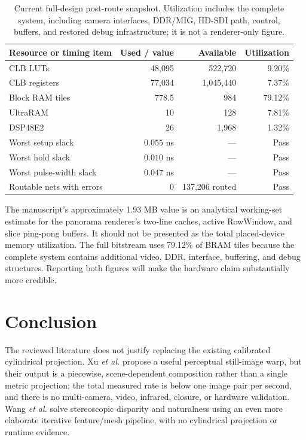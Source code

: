 \documentclass[10pt]{article}
\begin{document}
\begin{table}[ht]
\centering
\caption{Current full-design post-route snapshot. Utilization includes the complete system, including camera interfaces, DDR/MIG, HD-SDI path, control, buffers, and restored debug infrastructure; it is not a renderer-only figure.}
\label{tab:fpga}
\small
\begin{tabular}{@{}lrrr@{}}
\toprule
Resource or timing item & Used / value & Available & Utilization \\
\midrule
CLB LUTs & 48,095 & 522,720 & 9.20\% \\
CLB registers & 77,034 & 1,045,440 & 7.37\% \\
Block RAM tiles & 778.5 & 984 & 79.12\% \\
UltraRAM & 10 & 128 & 7.81\% \\
DSP48E2 & 26 & 1,968 & 1.32\% \\
\midrule
Worst setup slack & $0.055$ ns & --- & Pass \\
Worst hold slack & $0.010$ ns & --- & Pass \\
Worst pulse-width slack & $0.047$ ns & --- & Pass \\
Routable nets with errors & 0 & 137,206 routed & Pass \\
\bottomrule
\end{tabular}
\end{table}

The manuscript's approximately 1.93 MB value is an analytical working-set estimate for the panorama renderer's two-line caches, active RowWindow, and slice ping-pong buffers. It should not be presented as the total placed-device memory utilization. The full bitstream uses 79.12\% of BRAM tiles because the complete system contains additional video, DDR, interface, buffering, and debug structures. Reporting both figures will make the hardware claim substantially more credible.

\section{Conclusion}

The reviewed literature does not justify replacing the existing calibrated cylindrical projection. Xu \emph{et al.} propose a useful perceptual still-image warp, but their output is a piecewise, scene-dependent composition rather than a single metric projection; the total measured rate is below one image pair per second, and there is no multi-camera, video, infrared, closure, or hardware validation. Wang \emph{et al.} solve stereoscopic disparity and naturalness using an even more elaborate iterative feature/mesh pipeline, with no cylindrical projection or runtime evidence.
\end{document}
